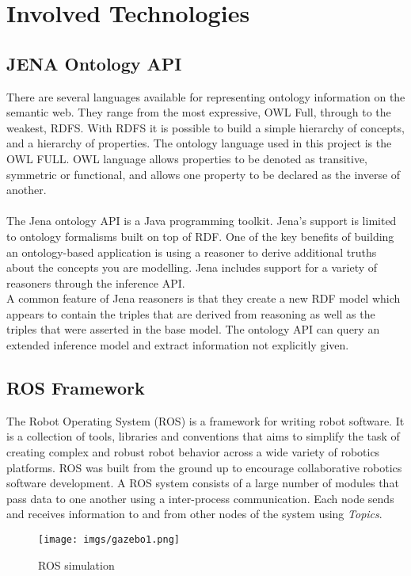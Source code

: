 
\section{Involved Technologies}

\subsection{JENA Ontology API}
There are several languages available for representing ontology information on the semantic web. They range from the most expressive, OWL Full, through to the weakest, RDFS. With RDFS it is possible to build a simple hierarchy of concepts, and a hierarchy of properties. The ontology language used in this project is the OWL FULL. OWL language allows properties to be denoted as transitive, symmetric or functional, and allows one property to be declared as the inverse of another.\\
\\
The Jena ontology API is a Java programming toolkit. Jena's support is limited to ontology formalisms built on top of RDF. One of the key benefits of building an ontology-based application is using a reasoner to derive additional truths about the concepts you are modelling. Jena includes support for a variety of reasoners through the inference API.
\\
A common feature of Jena reasoners is that they create a new RDF model which appears to contain the triples that are derived from reasoning as well as the triples that were asserted in the base model. The ontology API can query an extended inference model and extract information not explicitly given.

\subsection{ROS Framework}
The Robot Operating System (ROS) is a framework  for writing robot software. It is a collection of tools, libraries and conventions that aims to simplify the task of creating complex and robust robot behavior across a wide variety of robotics platforms. 
ROS was built from the ground up to encourage collaborative robotics software development. A ROS system consists of a large number of modules that pass data to one another using a inter-process communication. Each node sends and receives information to and from other nodes of the system using \textit{Topics}.
\\
\begin{figure}[H]
\centering
\texttt{[image: imgs/gazebo1.png]}
\label{fig:gazebo1}
\caption{ROS simulation}
\end{figure}

